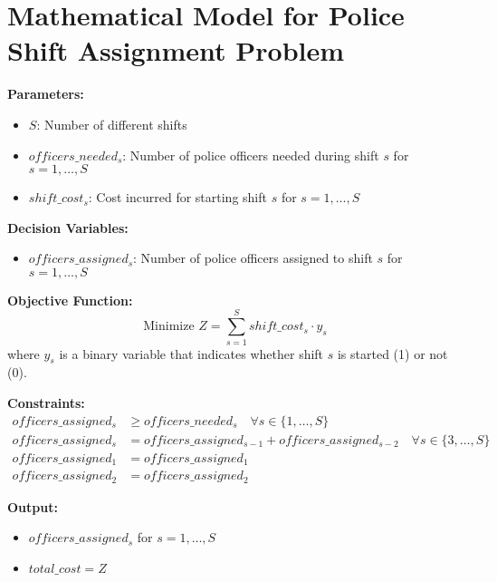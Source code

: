 \documentclass{article}
\begin{document}
\section*{Mathematical Model for Police Shift Assignment Problem}

\textbf{Parameters:}
\begin{itemize}
    \item \( S \): Number of different shifts
    \item \( officers\_needed_{s} \): Number of police officers needed during shift \( s \) for \( s = 1, \dots, S \)
    \item \( shift\_cost_{s} \): Cost incurred for starting shift \( s \) for \( s = 1, \dots, S \)
\end{itemize}

\textbf{Decision Variables:}
\begin{itemize}
    \item \( officers\_assigned_{s} \): Number of police officers assigned to shift \( s \) for \( s = 1, \dots, S \)
\end{itemize}

\textbf{Objective Function:}
\[
\text{Minimize } Z = \sum_{s=1}^{S} shift\_cost_{s} \cdot y_{s}
\]
where \( y_{s} \) is a binary variable that indicates whether shift \( s \) is started (1) or not (0).

\textbf{Constraints:}
\begin{align*}
    officers\_assigned_{s} & \geq officers\_needed_{s} \quad \forall s \in \{1, \ldots, S\} \\
    officers\_assigned_{s} & = officers\_assigned_{s-1} + officers\_assigned_{s-2} \quad \forall s \in \{3, \ldots, S\} \\
    officers\_assigned_{1} & = officers\_assigned_{1} \\
    officers\_assigned_{2} & = officers\_assigned_{2}
\end{align*}

\textbf{Output:}
\begin{itemize}
    \item \( officers\_assigned_{s} \) for \( s = 1, \ldots, S \)
    \item \( total\_cost = Z \)
\end{itemize}
\end{document}
